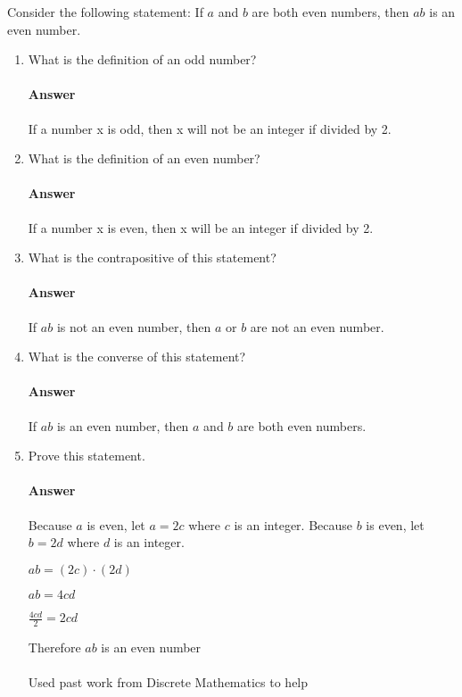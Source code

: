 \documentclass{article}
\begin{document}
\collab{}
Consider the following statement: If $a$ and $b$ are both even numbers, then $ab$ is
an even number.
\begin{enumerate}
    \item What is the definition of an odd number?
          
          \paragraph{Answer} If a number x is odd, then x will not be an integer if divided by 2.
          
    \item What is the definition of an even number?
          
          \paragraph{Answer} If a number x is even, then x will be an integer if divided by 2.
          
    \item What is the contrapositive of this statement?
          
          \paragraph{Answer} If $ab$ is not an even number, then $a$ or $b$ are not an even number.
          
    \item What is the converse of this statement?
          
          \paragraph{Answer} If $ab$ is an even number, then $a$ and $b$ are both even numbers.
          
    \item Prove this statement.
          
          \paragraph{Answer} Because $a$ is even, let $ a= 2c$ where $c$ is an integer.
          Because $b$ is even, let $ b= 2d$ where $d$ is an integer.
          
          $ab = (2c) \cdot (2d)$
          
          $ab = 4cd$
          
          $\frac{4cd}{2} = 2cd$
          
          Therefore $ab$ is an even number
          
          
          \paragraph{}
          Used past work from Discrete Mathematics to help
          
\end{enumerate}
\end{document}
